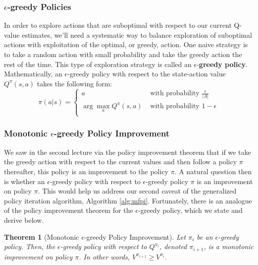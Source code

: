 \documentclass{article}
\newtheorem{theorem}{Theorem}[section]
\theoremstyle{definition}
\theoremstyle{remark}
\begin{document}
\subsubsection{$\epsilon$-greedy Policies}
In order to explore actions that are suboptimal with respect to our current Q-value estimates, we'll need a systematic way to balance exploration of suboptimal actions with exploitation of the optimal, or greedy, action. One naive strategy is to take a random action with small probability and take the greedy action the rest of the time.  This type of exploration strategy is called an $\epsilon$-\textbf{greedy policy}.  Mathematically, an $\epsilon$-greedy policy with respect to the state-action value $Q^\pi(s,a)$ takes the following form:
\[
  \pi(a | s) =
  \begin{cases}
       a & \text{ with probability } \frac{\epsilon}{|A|} \\
       \arg\max_{a} Q^\pi(s,a) & \text{ with probability } 1-\epsilon \\
  \end{cases}
\]

\subsubsection{Monotonic $\epsilon$-greedy Policy Improvement}
We saw in the second lecture via the policy improvement theorem that if we take the greedy action with respect to the current values and then follow a policy $\pi$ thereafter, this policy is an improvement to the policy $\pi$.  A natural question then is whether an $\epsilon$-greedy policy with respect to $\epsilon$-greedy policy $\pi$ is an improvement on policy $\pi$.  This would help us address our second caveat of the generalized policy iteration algorithm, Algorithm \ref{alg:mfpi}.  Fortunately, there is an analogue of the policy improvement theorem for the $\epsilon$-greedy policy, which we state and derive below.

\begin{theorem}[Monotonic $\epsilon$-greedy Policy Improvement]
Let $\pi_i$ be an $\epsilon$-greedy policy.  Then, the $\epsilon$-greedy policy with respect to $Q^{\pi_i}$, denoted $\pi_{i+1}$, is a monotonic improvement on policy $\pi$.  In other words, $V^{\pi_{i+1}} \geq V^{\pi_i}$.
\end{theorem}
\end{document}
